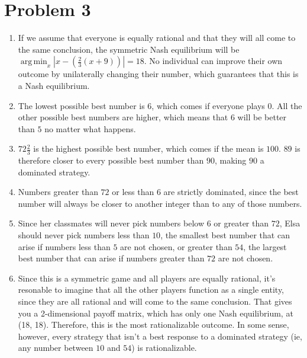 \documentclass[letterpaper]{article}
\DeclareMathOperator*{\argmin}{arg\,min}
\begin{document}
\section{Problem 3}
\begin{enumerate}
    \item If we assume that everyone is equally rational and that they will all come to the same conclusion, the symmetric Nash equilibrium will be $\argmin_x |x - \left(\frac{2}{3}(x + 9)\right)| = 18$. No individual can improve their own outcome by unilaterally changing their number, which guarantees that this is a Nash equilibrium.
    \item The lowest possible best number is $6$, which comes if everyone plays $0$. All the other possible best numbers are higher, which means that $6$ will be better than $5$ no matter what happens.
    \item $72\frac{2}{3}$ is the highest possible best number, which comes if the mean is $100$. $89$ is therefore closer to every possible best number than $90$, making $90$ a dominated strategy.
    \item Numbers greater than $72$ or less than $6$ are strictly dominated, since the best number will always be closer to another integer than to any of those numbers. 
    \item Since her classmates will never pick numbers below $6$ or greater than $72$, Elsa should never pick numbers less than $10$, the smallest best number that can arise if numbers less than $5$ are not chosen, or greater than $54$, the largest best number that can arise if numbers greater than $72$ are not chosen.
    \item Since this is a symmetric game and all players are equally rational, it's resonable to imagine that all the other players function as a single entity, since they are all rational and will come to the same conclusion. That gives you a 2-dimensional payoff matrix, which has only one Nash equilibrium, at (18, 18). Therefore, this is the most rationalizable outcome. In some sense, however, every strategy that isn't a best response to a dominated strategy (ie, any number between $10$ and $54$) is rationalizable.
        
\end{enumerate}
\end{document}
